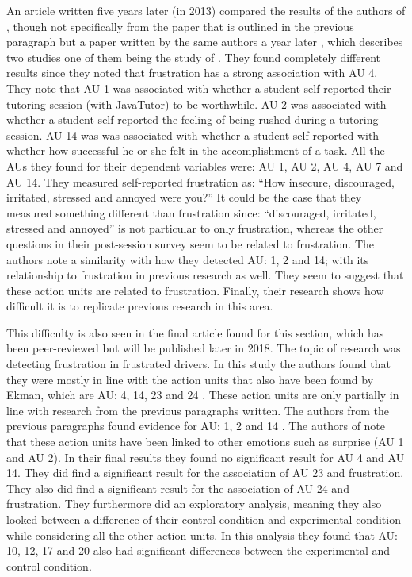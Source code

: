 An article written five years later (in 2013) compared the results of the authors of \cite{craig2008}, though not specifically from the paper that is outlined in the previous paragraph but a paper written by the same authors a year later \cite{craig2009}, which describes two studies one of them being the study of \cite{craig2008}. They found completely different results since they noted that frustration has a strong association with AU 4. They note that AU 1 was associated with whether a student self-reported their tutoring session (with JavaTutor) to be worthwhile. AU 2 was associated with whether a student self-reported the feeling of being rushed during a tutoring session. AU 14 was was associated with whether a student self-reported with whether how successful he or she felt in the accomplishment of a task. All the AUs they found for their dependent variables were: AU 1, AU 2, AU 4, AU 7 and AU 14. They measured self-reported frustration as: ``How insecure, discouraged, irritated, stressed and annoyed were you?'' \cite{grafsgaard2013} It could be the case that they measured something different than frustration since: ``discouraged, irritated, stressed and annoyed'' is not particular to only frustration, whereas the other questions in their post-session survey seem to be related to frustration. The authors note a similarity with how they detected AU: 1, 2 and 14; with its relationship to frustration in previous research as well. They seem to suggest that these action units are related to frustration. Finally, their research shows how difficult it is to replicate previous research in this area.

This difficulty is also seen in the final article found for this section, which has been peer-reviewed but will be published later in 2018. The topic of research was detecting frustration in frustrated drivers. In this study the authors found that they were mostly in line with the action units that also have been found by Ekman, which are AU: 4, 14, 23 and 24 \cite{ihme2018}. These action units are only partially in line with research from the previous paragraphs written. The authors from the previous paragraphs found evidence for AU: 1, 2 and 14 \cite{craig2008, grafsgaard2013}. The authors of \cite{ihme2018} note that these action units have been linked to other emotions such as surprise (AU 1 and AU 2)\cite{ihme2018}. In their final results they found no significant result for AU 4 and AU 14. They did find a significant result for the association of AU 23 and frustration. They also did find a significant result for the association of AU 24 and frustration. They furthermore did an exploratory analysis, meaning they also looked between a difference of their control condition and experimental condition while considering all the other action units. In this analysis they found that AU: 10, 12, 17 and 20 also had significant differences between the experimental and control condition.

